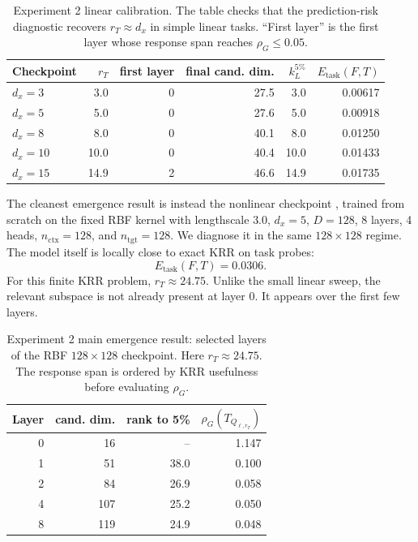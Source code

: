 \documentclass[11pt]{article}
\begin{document}
\begin{table}[htbp]
\centering
\caption{Experiment 2 linear calibration. The table checks that the prediction-risk diagnostic
recovers \(r_T\approx d_x\) in simple linear tasks. ``First layer'' is the first layer whose response
span reaches \(\rho_G\le0.05\).}
\scriptsize
\setlength{\tabcolsep}{4pt}
\renewcommand{\arraystretch}{0.9}
\begin{tabular}{lrrrrr}
\toprule
Checkpoint & \(r_T\) & first layer & final cand. dim. & \(k_L^{5\%}\) & \(E_{\mathrm{task}}(F,T)\)\\
\midrule
\(d_x=3\)  & 3.0  & 0 & 27.5 & 3.0  & 0.00617\\
\(d_x=5\)  & 5.0  & 0 & 27.6 & 5.0  & 0.00918\\
\(d_x=8\)  & 8.0  & 0 & 40.1 & 8.0  & 0.01250\\
\(d_x=10\) & 10.0 & 0 & 40.4 & 10.0 & 0.01433\\
\(d_x=15\) & 14.9 & 2 & 46.6 & 14.9 & 0.01735\\
\bottomrule
\end{tabular}
\renewcommand{\arraystretch}{1}
\end{table}

The cleanest emergence result is instead the nonlinear checkpoint
, trained from scratch on the fixed RBF kernel with
lengthscale \(3.0\), \(d_x=5\), \(D=128\), 8 layers, 4 heads, \(n_{\mathrm{ctx}}=128\), and
\(n_{\mathrm{tgt}}=128\). We diagnose it in the same \(128\times128\) regime. The model itself is
locally close to exact KRR on task probes:
\[
E_{\mathrm{task}}(F,T)=0.0306.
\]
For this finite KRR problem, \(r_T\approx24.75\). Unlike the small linear sweep, the relevant
subspace is not already present at layer 0. It appears over the first few layers.

\begin{table}[htbp]
\centering
\caption{Experiment 2 main emergence result: selected layers of the RBF \(128\times128\) checkpoint.
Here \(r_T\approx24.75\). The response span is ordered by KRR usefulness before evaluating
\(\rho_G\).}
\scriptsize
\setlength{\tabcolsep}{4pt}
\renewcommand{\arraystretch}{0.9}
\begin{tabular}{rrrr}
\toprule
Layer & cand. dim. & rank to 5\% & \(\rho_G(T_{Q_{\ell,r_T}})\)\\
\midrule
0 & 16  & --   & 1.147\\
1 & 51  & 38.0 & 0.100\\
2 & 84  & 26.9 & 0.058\\
4 & 107 & 25.2 & 0.050\\
8 & 119 & 24.9 & 0.048\\
\bottomrule
\end{tabular}
\renewcommand{\arraystretch}{1}
\end{table}
\end{document}
